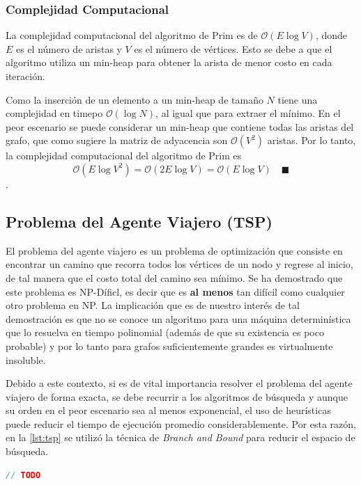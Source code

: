 \documentclass[12pt]{article}
\begin{document}
  \subsubsection{Complejidad Computacional}
  La complejidad computacional del algoritmo de Prim es de $\mathcal{O}(E\log V)$, donde $E$ es el número de aristas
  y $V$ es el número de vértices. Esto se debe a que el algoritmo utiliza un min-heap para obtener la arista
  de menor costo en cada iteración. 
  
  Como la inserción de un elemento a un min-heap de tamaño $N$ tiene una complejidad en timepo $\mathcal{O}(\log N)$, al igual que para extraer el mínimo. 
  En el peor escenario se puede considerar un min-heap que contiene todas las aristas del grafo, que como sugiere la matriz de adyacencia
  son $\mathcal{O}(V^2)$ aristas. Por lo tanto, la complejidad computacional del algoritmo de Prim es 
  $$\mathcal{O}(E\log V^{2}) = \mathcal{O}(2E\log V) = \mathcal{O}(E\log V) \quad \blacksquare$$.

  \subsection{Problema del Agente Viajero (TSP)}

  El problema del agente viajero es un problema de optimización que consiste en encontrar un camino que recorra todos los vértices de un nodo y regrese al inicio,
  de tal manera que el costo total del camino sea mínimo. Se ha demostrado que este problema es NP-Díficl, es decir que es \textbf{al menos} tan difícil como cualquier otro problema en NP.
  La implicación que es de nuestro interés de tal demostración es que no se conoce un algoritmo para una máquina determinística que lo resuelva en tiempo polinomial (además de que su existencia 
  es poco probable) y por lo tanto para grafos suficientemente grandes es virtualmente insoluble.

  Debido a este contexto, si es de vital importancia resolver el problema del agente viajero de forma exacta, se debe recurrir a los algoritmos de búsqueda y aunque su orden en el peor escenario 
  sea al menos exponencial, el uso de heurísticas puede reducir el tiempo de ejecución promedio considerablemente. Por esta razón, en la \autoref{lst:tsp} se utilizó la técnica de
  \textit{Branch and Bound} para reducir el espacio de búsqueda.

  \begin{lstlisting}[language=cpp, caption={Branch and Bound para TSP}, label={lst:tsp}]
// TODO
  \end{lstlisting}
\end{document}
